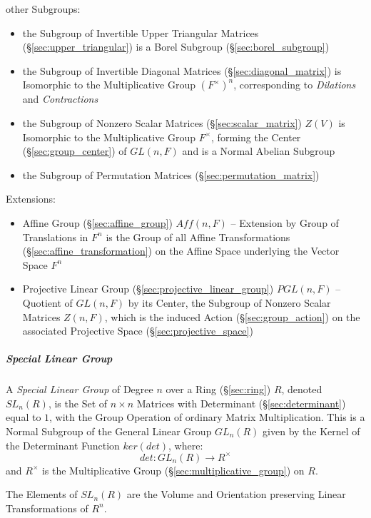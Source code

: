 other Subgroups:
\begin{itemize}
  \item the Subgroup of Invertible Upper Triangular Matrices
    (\S\ref{sec:upper_triangular}) is a Borel Subgroup
    (\S\ref{sec:borel_subgroup})
  \item the Subgroup of Invertible Diagonal Matrices
    (\S\ref{sec:diagonal_matrix}) is Isomorphic to the Multiplicative Group
    $(F^\times)^n$, corresponding to \emph{Dilations} and \emph{Contractions}
  \item the Subgroup of Nonzero Scalar Matrices (\S\ref{sec:scalar_matrix})
    $Z(V)$ is Isomorphic to the Multiplicative Group $F^\times$, forming the
    Center (\S\ref{sec:group_center}) of $GL(n,F)$ and is a Normal Abelian
    Subgroup
  \item the Subgroup of Permutation Matrices (\S\ref{sec:permutation_matrix})
\end{itemize}

Extensions:
\begin{itemize}
  \item Affine Group (\S\ref{sec:affine_group}) $Aff(n,F)$ -- Extension by
    Group of Translations in $F^n$ is the Group of all Affine Transformations
    (\S\ref{sec:affine_transformation}) on the Affine Space underlying the
    Vector Space $F^n$
  \item Projective Linear Group (\S\ref{sec:projective_linear_group})
    $PGL(n,F)$ -- Quotient of $GL(n,F)$ by its Center, the Subgroup of Nonzero
    Scalar Matrices $Z(n,F)$, which is the induced Action
    (\S\ref{sec:group_action}) on the associated Projective Space
    (\S\ref{sec:projective_space})
\end{itemize}



\subparagraph{Special Linear Group}\label{sec:special_linear_group}\hfill

A \emph{Special Linear Group} of Degree $n$ over a Ring (\S\ref{sec:ring}) $R$,
denoted $SL_n(R)$, is the Set of $n \times n$ Matrices with Determinant
(\S\ref{sec:determinant}) equal to $1$, with the Group Operation of ordinary
Matrix Multiplication. This is a Normal Subgroup of the General Linear Group
$GL_n(R)$ given by the Kernel of the Determinant Function $ker(det)$, where:
\[
  det : GL_n(R) \rightarrow R^\times
\]
and $R^\times$ is the Multiplicative Group
(\S\ref{sec:multiplicative_group}) on $R$.

The Elements of $SL_n(R)$ are the Volume and Orientation preserving
Linear Transformations of $R^n$.

